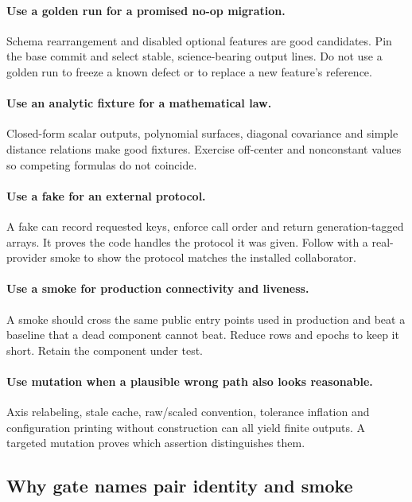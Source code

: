 \documentclass[10pt,aps,prd,twocolumn,nofootinbib]{revtex4-2}
\begin{document}
\paragraph{Use a golden run for a promised no-op migration.}
Schema rearrangement and disabled optional features are good candidates.  Pin
the base commit and select stable, science-bearing output lines.  Do not use a
golden run to freeze a known defect or to replace a new feature's reference.

\paragraph{Use an analytic fixture for a mathematical law.}
Closed-form scalar outputs, polynomial surfaces, diagonal covariance and
simple distance relations make good fixtures.  Exercise off-center and
nonconstant values so competing formulas do not coincide.

\paragraph{Use a fake for an external protocol.}
A fake can record requested keys, enforce call order and return
generation-tagged arrays.  It proves the code handles the protocol it was
given.  Follow with a real-provider smoke to show the protocol matches the
installed collaborator.

\paragraph{Use a smoke for production connectivity and liveness.}
A smoke should cross the same public entry points used in production and beat
a baseline that a dead component cannot beat.  Reduce rows and epochs to keep
it short.  Retain the component under test.

\paragraph{Use mutation when a plausible wrong path also looks reasonable.}
Axis relabeling, stale cache, raw/scaled convention, tolerance inflation and
configuration printing without construction can all yield finite outputs.
A targeted mutation proves which assertion distinguishes them.

\subsection{Why gate names pair identity and smoke}
\end{document}
